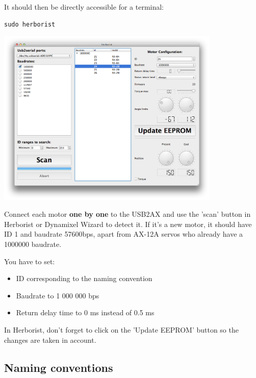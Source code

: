 \documentclass[includefoot]{article}
\begin{document}
It should then be directly accessible for a terminal:
\begin{verbatim}
sudo herborist
\end{verbatim}
 \begin{center}
  \includegraphics[width=0.8\textwidth]{img/herborist}
 \end{center}
 
 Connect each motor \textbf{one by one} to the USB2AX and use the 'scan' button in Herborist or Dynamixel Wizard to detect it. If it's a new motor, it should have ID 1 and baudrate 57600bps, apart from AX-12A servos who already have a 1000000 baudrate.

You have to set:
\begin{itemize}
\item ID corresponding to the naming convention
\item Baudrate to 1 000 000 bps
\item Return delay time to 0 ms instead of 0.5 ms
\end{itemize}

In Herborist, don't forget to click on the 'Update EEPROM' button so the changes are taken in account.


\subsection{Naming conventions}
\end{document}
